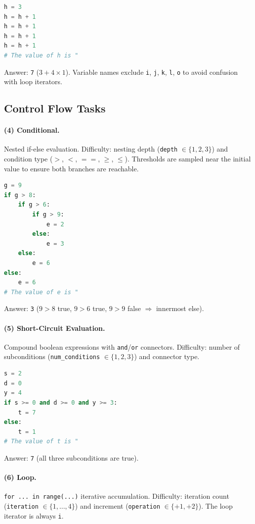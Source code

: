 \begin{lstlisting}[language=Python]
h = 3
h = h + 1
h = h + 1
h = h + 1
h = h + 1
# The value of h is "
\end{lstlisting}
\noindent Answer: \texttt{7} ($3 + 4 \times 1$). Variable names exclude \texttt{i}, \texttt{j}, \texttt{k}, \texttt{l}, \texttt{o} to avoid confusion with loop iterators.

\subsection{Control Flow Tasks}
\label{app:subsec:control_flow}


\paragraph{(4) Conditional.}
Nested if-else evaluation. Difficulty: nesting depth (\texttt{depth} $\in\{1,2,3\}$) and condition type ($>$, $<$, $==$, $\geq$, $\leq$). Thresholds are sampled near the initial value to ensure both branches are reachable.

\begin{lstlisting}[language=Python]
g = 9
if g > 8:
    if g > 6:
        if g > 9:
            e = 2
        else:
            e = 3
    else:
        e = 6
else:
    e = 6
# The value of e is "
\end{lstlisting}
\noindent Answer: \texttt{3} ($9>8$ true, $9>6$ true, $9>9$ false $\Rightarrow$ innermost else).

\paragraph{(5) Short-Circuit Evaluation.}
Compound boolean expressions with \texttt{and}/\texttt{or} connectors. Difficulty: number of subconditions (\texttt{num\_conditions} $\in\{1,2,3\}$) and connector type.

\begin{lstlisting}[language=Python]
s = 2
d = 0
y = 4
if s >= 0 and d >= 0 and y >= 3:
    t = 7
else:
    t = 1
# The value of t is "
\end{lstlisting}
\noindent Answer: \texttt{7} (all three subconditions are true).

\paragraph{(6) Loop.}
\texttt{for~...~in~range(...)} iterative accumulation. Difficulty: iteration count (\texttt{iteration} $\in\{1,\dots,4\}$) and increment (\texttt{operation} $\in\{+1, +2\}$). The loop iterator is always \texttt{i}.

